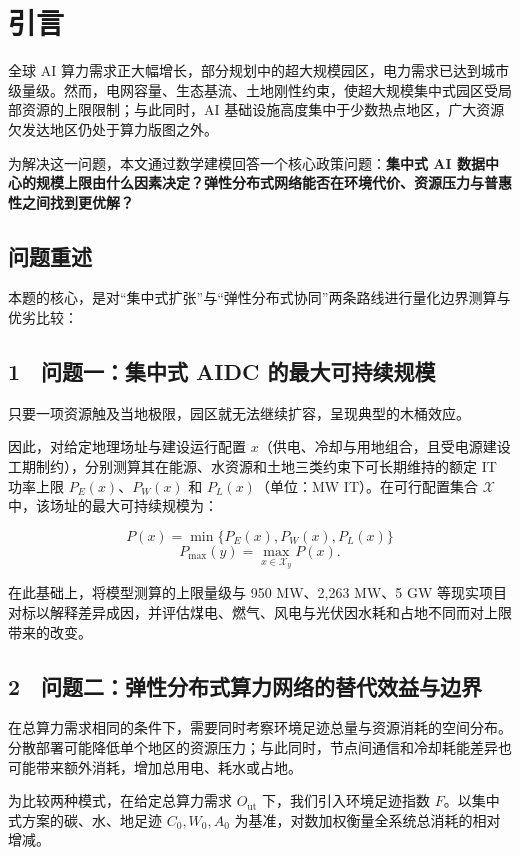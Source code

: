 \section{引言}

全球 AI 算力需求正大幅增长，部分规划中的超大规模园区，电力需求已达到城市级量级。然而，电网容量、生态基流、土地刚性约束，使超大规模集中式园区受局部资源的上限限制；与此同时，AI 基础设施高度集中于少数热点地区，广大资源欠发达地区仍处于算力版图之外。

为解决这一问题，本文通过数学建模回答一个核心政策问题：\textbf{集中式 AI 数据中心的规模上限由什么因素决定？弹性分布式网络能否在环境代价、资源压力与普惠性之间找到更优解？}

\subsection{问题重述}

本题的核心，是对“集中式扩张”与“弹性分布式协同”两条路线进行量化边界测算与优劣比较：

\subsection{1　问题一：集中式 AIDC 的最大可持续规模}

只要一项资源触及当地极限，园区就无法继续扩容，呈现典型的木桶效应。

因此，对给定地理场址与建设运行配置 $x$（供电、冷却与用地组合，且受电源建设工期制约），分别测算其在能源、水资源和土地三类约束下可长期维持的额定 IT 功率上限 $P_E(x)$、$P_W(x)$ 和 $P_L(x)$（单位：MW IT）。在可行配置集合 $\mathcal X$ 中，该场址的最大可持续规模为：

\[
P(x)=\min\{P_E(x),P_W(x),P_L(x)\}
\]
\[
P_{\max}(y)=\max_{x\in\mathcal X_y}P(x).
\]

在此基础上，将模型测算的上限量级与 950 MW、2,263 MW、5 GW 等现实项目对标以解释差异成因，并评估煤电、燃气、风电与光伏因水耗和占地不同而对上限带来的改变。

\subsection{2　问题二：弹性分布式算力网络的替代效益与边界}

在总算力需求相同的条件下，需要同时考察环境足迹总量与资源消耗的空间分布。分散部署可能降低单个地区的资源压力；与此同时，节点间通信和冷却耗能差异也可能带来额外消耗，增加总用电、耗水或占地。

为比较两种模式，在给定总算力需求 $O_{\mathrm{ut}}$ 下，我们引入环境足迹指数 $F$。以集中式方案的碳、水、地足迹 $C_0,W_0,A_0$ 为基准，对数加权衡量全系统总消耗的相对增减。

